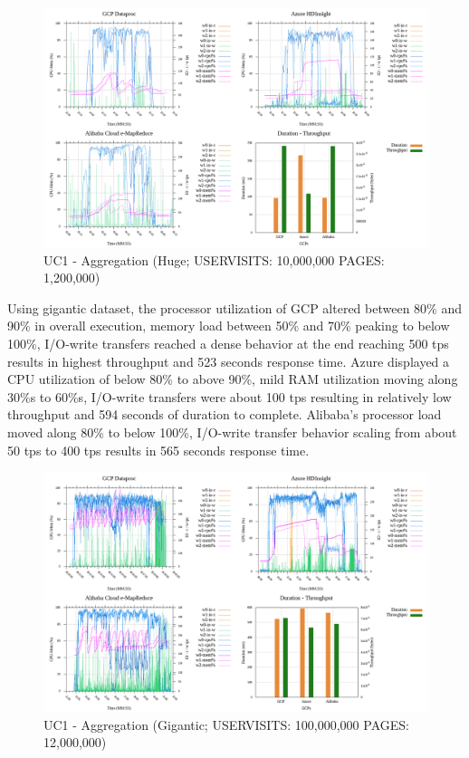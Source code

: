 \documentclass[review]{elsarticle}
\begin{document}
	\begin{figure}[p]
		\caption{UC1 - Aggregation (Huge; USERVISITS: 10,000,000 PAGES: 1,200,000)}
		\label{fig:uc1-aggreg-h-cmidt}
		\includegraphics[width=\textwidth]{uc1-aggreg-h-cmidt}
		\centering
	\end{figure}
	
	Using gigantic dataset, the processor utilization of GCP altered between 80\% and 90\% in overall execution, memory load between 50\% and 70\% peaking to below 100\%, I/O-write transfers reached a dense behavior at the end reaching 500 tps results in highest throughput and 523 seconds response time. Azure displayed a CPU utilization of below 80\% to above 90\%, mild RAM utilization moving along 30\%s to 60\%s, I/O-write transfers were about 100 tps resulting in relatively low throughput and 594 seconds of duration to complete. Alibaba's processor load moved along 80\% to below 100\%, I/O-write transfer behavior scaling from about 50 tps to 400 tps results in 565 seconds response time.
	
	\begin{figure}[p]
		\caption{UC1 - Aggregation (Gigantic; USERVISITS: 100,000,000 PAGES: 12,000,000)}
		\label{fig:uc1-aggreg-g-cmidt}
		\includegraphics[width=\textwidth]{uc1-aggreg-g-cmidt}
		\centering
	\end{figure}
	
\end{document}
